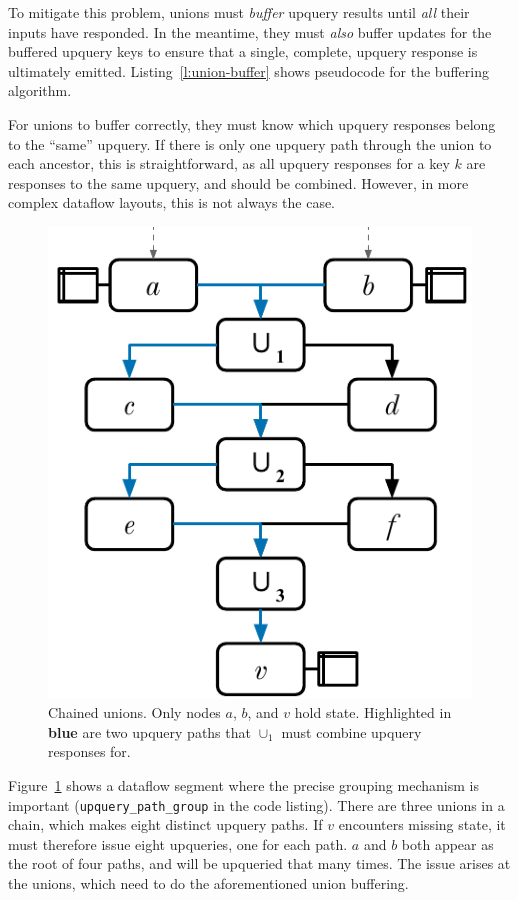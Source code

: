 To mitigate this problem, unions must \textit{buffer} upquery results until
\emph{all} their inputs have responded. In the meantime, they must \emph{also}
buffer updates for the buffered upquery keys to ensure that a single, complete,
upquery response is ultimately emitted. Listing~\vref{l:union-buffer} shows
pseudocode for the buffering algorithm.

For unions to buffer correctly, they must know which upquery responses belong to
the ``same'' upquery. If there is only one upquery path through the union to
each ancestor, this is straightforward, as all upquery responses for a key $k$
are responses to the same upquery, and should be combined. However, in more
complex dataflow layouts, this is not always the case.

\begin{figure}[t]
  \centering
  \includegraphics{diagrams/Chained Unions.pdf}
  \caption{Chained unions. Only nodes $a$, $b$, and $v$ hold state. Highlighted
  in \textbf{\color{set1}blue} are two upquery paths that $\cup_1$ must combine
  upquery responses for.}
  \label{f:chained-union}
\end{figure}

Figure~\ref{f:chained-union} shows a dataflow segment where the precise grouping
mechanism is important (\texttt{upquery\_path\_group} in the code listing).
There are three unions in a chain, which makes eight distinct upquery paths. If
$v$ encounters missing state, it must therefore issue eight upqueries, one for
each path. $a$ and $b$ both appear as the root of four paths, and will be
upqueried that many times. The issue arises at the unions, which need to do
the aforementioned union buffering.

